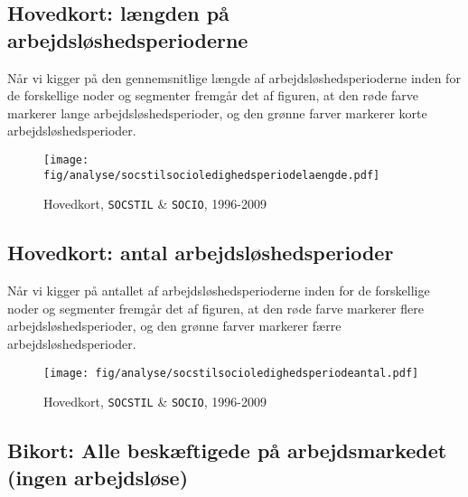 \newpage \subsection{Hovedkort: længden på arbejdsløshedsperioderne \label{}}

Når vi kigger på den gennemsnitlige længde af arbejdsløshedsperioderne inden for de forskellige noder og segmenter fremgår det af figuren, at den røde farve markerer lange arbejdsløshedsperioder, og den grønne farver markerer korte arbejdsløshedsperioder.

\begin{figure}[H]
\begin{centering}
	\caption{Hovedkort, \texttt{SOCSTIL} \& \texttt{SOCIO}, 1996-2009}
	\texttt{[image: fig/analyse/socstilsocioledighedsperiodelaengde.pdf]}
	\label{fig_hist_beskaeftigede_allekategorier132}
\end{centering}
\end{figure}


\newpage \subsection{Hovedkort: antal arbejdsløshedsperioder \label{}}

Når vi kigger på antallet af arbejdsløshedsperioderne inden for de forskellige noder og segmenter fremgår det af figuren, at den røde farve markerer flere arbejdsløshedsperioder, og den grønne farver markerer færre arbejdsløshedsperioder.

\begin{figure}[H]
\begin{centering}
	\caption{Hovedkort, \texttt{SOCSTIL} \& \texttt{SOCIO}, 1996-2009}
	\texttt{[image: fig/analyse/socstilsocioledighedsperiodeantal.pdf]}
	\label{fig_hist_beskaeftigede_allekategorier132}
\end{centering}
\end{figure}


\newpage \subsection{Bikort: Alle beskæftigede på arbejdsmarkedet (ingen arbejdsløse) \label{}}

